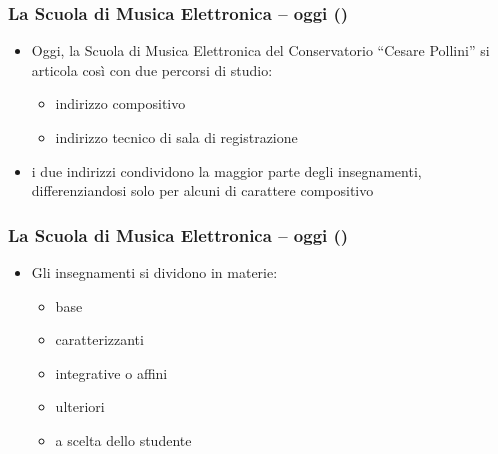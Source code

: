 %
%
%

\setcounter{ms}{0}
\begin{frame}
    \frametitle<+->{La Scuola di Musica Elettronica -- oggi ()}

	\begin{itemize}[<+- | alert@+->]

		\item Oggi, la Scuola di Musica Elettronica del Conservatorio ``Cesare Pollini''
          si articola cos\`i con due percorsi di studio:

      \begin{itemize}[<+- | alert@+->]

        \item indirizzo compositivo

        \item indirizzo tecnico di sala di registrazione

     \end{itemize}

    \item i due indirizzi condividono la maggior parte degli insegnamenti,
          differenziandosi solo per alcuni di carattere
          compositivo

	\end{itemize}

\end{frame}

\begin{frame}
    \frametitle<+->{La Scuola di Musica Elettronica -- oggi ()}

	\begin{itemize}[<+- | alert@+->]

    \item Gli insegnamenti si dividono in materie:

	  \begin{itemize}[<+- | alert@+->]

      \item base
      
      \item caratterizzanti

      \item integrative o affini

      \item ulteriori

      \item a scelta dello studente

	  \end{itemize}

	\end{itemize}

\end{frame}

